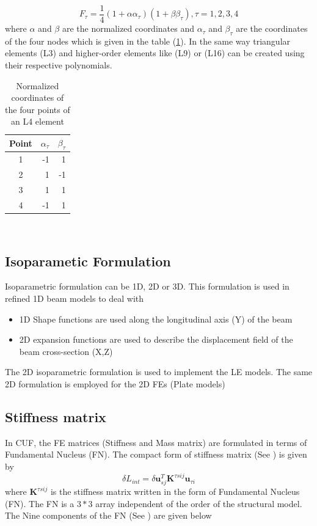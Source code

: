 \documentclass[a4paper,12pt]{article}
\begin{document}
\begin{equation}
F_\tau = \frac{1}{4}(1+\alpha\alpha_\tau)(1+\beta\beta_\tau), \tau = 1,2,3,4 
\label{shapefunc} 
\end{equation}
where $\alpha$ and $\beta$ are the normalized coordinates and $\alpha_\tau$ and $\beta_\tau$ are the coordinates of the four nodes which is given in the table (\ref{tab:table1}). In the same way triangular elements (L3) and  higher-order elements like (L9) or (L16) can be created using their respective polynomials.
\begin{table}[h!]
  \begin{center}
     \begin{tabular}{c|r|r} 
      \textbf{Point} & \textbf{$\alpha_\tau$} & \textbf{$\beta_\tau$}\\
      \hline
      1 & -1 &  1\\
      2 &  1 & -1\\
      3 &  1 &  1\\
      4 & -1 &  1 
    \end{tabular}
    \caption{Normalized coordinates of the four     points of an L4 element}
    \label{tab:table1}
  \end{center}
\end{table}\\

\newpage
\subsection*{Isoparametic Formulation}
\indent\indent\indent\indent Isoparametric formulation can be 1D, 2D or 3D. This formulation is used in refined 1D beam models to deal with
\begin{itemize}
\item 1D Shape functions are used along the longitudinal axis (Y) of the beam
\item 2D expansion functions are used to describe the displacement field of the beam cross-section (X,Z)
\end{itemize}
The 2D isoparametric formulation is used to implement the LE models. The same 2D formulation is employed for the 2D FEs (Plate models)

\subsection*{Stiffness matrix}
\indent\indent\indent\indent In CUF, the FE matrices (Stiffness and Mass matrix) are formulated in terms of Fundamental Nucleus (FN). The compact form of stiffness matrix (See \cite{carrera2013use}) is given by
\begin{equation}
\delta L_{int} = \delta \textbf{u}_{sj}^{T} \textbf{K}^{\tau s i j} \textbf{u}_{\tau i}
\label{Internal}   
\end{equation}
where $\textbf{K}^{\tau s i j}$ is the stiffness matrix written in the form of Fundamental Nucleus (FN). The FN is a $3*3$ array independent of the order of the structural model. The Nine components of the FN (See \cite{carrera2014finite}) are given below\\
\end{document}
